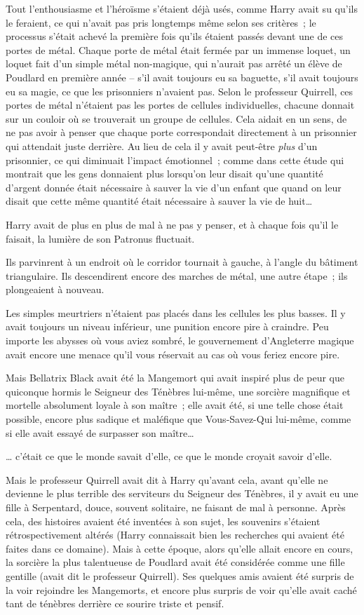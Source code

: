 Tout l'enthousiasme et l'héroïsme s'étaient déjà usés, comme Harry avait su qu'ils le feraient, ce qui n'avait pas pris longtemps même selon ses critères~; le processus s'était achevé la première fois qu'ils étaient passés devant une de ces portes de métal. Chaque porte de métal était fermée par un immense loquet, un loquet fait d'un simple métal non-magique, qui n'aurait pas arrêté un élève de Poudlard en première année -- s'il avait toujours eu sa baguette, s'il avait toujours eu sa magie, ce que les prisonniers n'avaient pas. Selon le professeur Quirrell, ces portes de métal n'étaient pas les portes de cellules individuelles, chacune donnait sur un couloir où se trouverait un groupe de cellules. Cela aidait en un sens, de ne pas avoir à penser que chaque porte correspondait directement à un prisonnier qui attendait juste derrière. Au lieu de cela il y avait peut-être \emph{plus} d'un prisonnier, ce qui diminuait l'impact émotionnel~; comme dans cette étude qui montrait que les gens donnaient plus lorsqu'on leur disait qu'une quantité d'argent donnée était nécessaire à sauver la vie d'un enfant que quand on leur disait que cette même quantité était nécessaire à sauver la vie de huit…

Harry avait de plus en plus de mal à ne pas y penser, et à chaque fois qu'il le faisait, la lumière de son Patronus fluctuait.

Ils parvinrent à un endroit où le corridor tournait à gauche, à l'angle du bâtiment triangulaire. Ils descendirent encore des marches de métal, une autre étape~; ils plongeaient à nouveau.

Les simples meurtriers n'étaient pas placés dans les cellules les plus basses. Il y avait toujours un niveau inférieur, une punition encore pire à craindre. Peu importe les abysses où vous aviez sombré, le gouvernement d'Angleterre magique avait encore une menace qu'il vous réservait au cas où vous feriez encore pire.

Mais Bellatrix Black avait été la Mangemort qui avait inspiré plus de peur que quiconque hormis le Seigneur des Ténèbres lui-même, une sorcière magnifique et mortelle absolument loyale à son maître~; elle avait été, si une telle chose était possible, encore plus sadique et maléfique que Vous-Savez-Qui lui-même, comme si elle avait essayé de surpasser son maître…

… c'était ce que le monde savait d'elle, ce que le monde croyait savoir d'elle.

Mais le professeur Quirrell avait dit à Harry qu'avant cela, avant qu'elle ne devienne le plus terrible des serviteurs du Seigneur des Ténèbres, il y avait eu une fille à Serpentard, douce, souvent solitaire, ne faisant de mal à personne. Après cela, des histoires avaient été inventées à son sujet, les souvenirs s'étaient rétrospectivement altérés (Harry connaissait bien les recherches qui avaient été faites dans ce domaine). Mais à cette époque, alors qu'elle allait encore en cours, la sorcière la plus talentueuse de Poudlard avait été considérée comme une fille gentille (avait dit le professeur Quirrell). Ses quelques amis avaient été surpris de la voir rejoindre les Mangemorts, et encore plus surpris de voir qu'elle avait caché tant de ténèbres derrière ce sourire triste et pensif.


